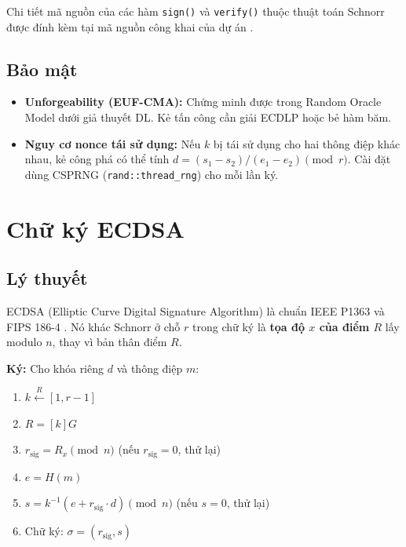 Chi tiết mã nguồn của các hàm \texttt{sign()} và \texttt{verify()} thuộc
thuật toán Schnorr được đính kèm tại mã nguồn công khai của dự án
\citep{LumenMath}.

\subsection{Bảo mật}\label{bux1ea3o-mux1eadt}

\begin{itemize}
\tightlist
\item
  \textbf{Unforgeability (EUF-CMA):} Chứng minh được trong Random Oracle
  Model dưới giả thuyết DL. Kẻ tấn công cần giải ECDLP hoặc bẻ hàm băm.
\item
  \textbf{Nguy cơ nonce tái sử dụng:} Nếu \(k\) bị tái sử dụng cho hai
  thông điệp khác nhau, kẻ công phá có thể tính
  \(d = (s_1 - s_2)/(e_1 - e_2) \pmod{r}\). Cài đặt dùng CSPRNG
  (\texttt{rand::thread\_rng}) cho mỗi lần ký.
\end{itemize}

\section{Chữ ký ECDSA}\label{chux1eef-kuxfd-ecdsa}

\subsection{Lý thuyết}\label{luxfd-thuyux1ebft-1}

ECDSA (Elliptic Curve Digital Signature Algorithm) là chuẩn IEEE P1363
và FIPS 186-4 \citep{FIPS186_4}. Nó khác Schnorr ở chỗ \(r\) trong chữ
ký là \textbf{tọa độ \(x\) của điểm \(R\)} lấy modulo \(n\), thay vì bản
thân điểm \(R\).

\textbf{Ký:} Cho khóa riêng \(d\) và thông điệp \(m\):

\begin{enumerate}
\def\labelenumi{\arabic{enumi}.}
\tightlist
\item
  \(k \xleftarrow{R} [1, r-1]\)
\item
  \(R = [k]G\)
\item
  \(r_{\text{sig}} = R_x \pmod{n}\) (nếu \(r_{\text{sig}} = 0\), thử
  lại)
\item
  \(e = H(m)\)
\item
  \(s = k^{-1}(e + r_{\text{sig}} \cdot d) \pmod{n}\) (nếu \(s = 0\),
  thử lại)
\item
  Chữ ký: \(\sigma = (r_{\text{sig}}, s)\)
\end{enumerate}

